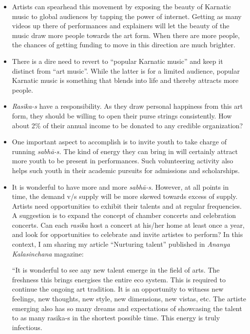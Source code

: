 \begin{itemize}
\itemsep=0pt
\item Artists can spearhead this movement by exposing the beauty of Karnatic music to global audiences by tapping the power of internet. Getting as many videos up there of performances and explainers will let the beauty of the music draw more people towards the art form. When there are more people, the chances of getting funding to move in this direction are much brighter.

 \item There is a dire need to revert to “popular Karnatic music” and keep it distinct from “art music”. While the latter is for a limited audience, popular Karnatic music is something that blends into life and thereby attracts more people.

 \item \textit{Rasika-s} have a responsibility. As they draw personal happiness from this art form, they should be willing to open their purse strings consistently. How about 2\% of their annual income to be donated to any credible organization?

 \item One important aspect to accomplish is to invite youth to take charge of running \textit{sabhā-s.} The kind of energy they can bring in will certainly attract more youth to be present in performances. Such volunteering activity also helps such youth in their academic pursuits for admissions and scholarships.

 \item 
 It is wonderful to have more and more \textit{sabhā-s.} However, at all points in time, the demand v/s supply will be more skewed towards excess of supply. Artists need opportunities to exhibit their talents and at regular frequencies. A suggestion is to expand the concept of chamber concerts and celebration concerts. Can each \textit{rasika} host a concert at his/her home at least once a year, and look for opportunities to celebrate and invite artistes to perform? In this context, I am sharing my article “Nurturing talent” published in \textit{Ananya Kalasinchana} magazine:

\begin{myquote}
“It is wonderful to see any new talent emerge in the field of arts. The freshness this brings energises the entire eco system. This is required to continue the ongoing art tradition. It is an opportunity to witness new feelings, new thoughts, new style, new dimensions, new vistas, etc. The artiste emerging also has so many dreams and expectations of showcasing the talent to as many rasika-s in the shortest possible time. This energy is truly infectious.
\end{myquote}


\end{itemize}
